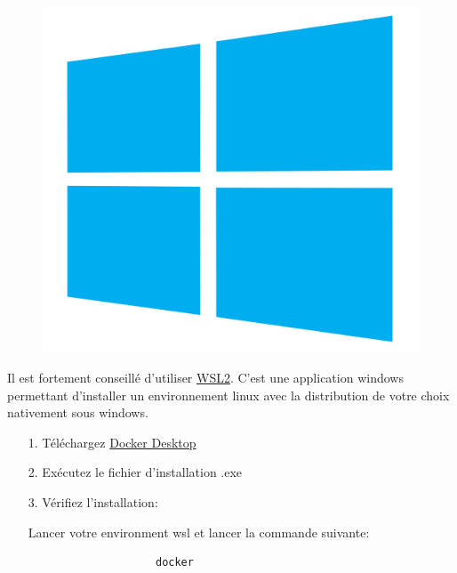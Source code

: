 \documentclass[internal]{nhitec_design}
\begin{document}
        \begin{figure}[h]
            \centering
            \includegraphics[scale=0.025]{Images_formation/WindowsLogo.png}
        \end{figure}

        Il est fortement conseillé d'utiliser \href{https://learn.microsoft.com/fr-fr/windows/wsl/install}{WSL2}. C'est une application windows permettant d'installer un environnement linux avec la distribution de votre choix nativement sous windows.
        
        \begin{itemize}
            \item[1.] Téléchargez \href{https://desktop.docker.com/win/main/amd64/Docker%20Desktop%20Installer.exe}{Docker Desktop}
            
            \item[2.] Exécutez le fichier d'installation .exe
            
            \item[3.] Vérifiez l'installation: 
            
                Lancer votre environment wsl et lancer la commande suivante:
                \begin{lstlisting}
                    docker
                \end{lstlisting}
        \end{itemize}
\end{document}
